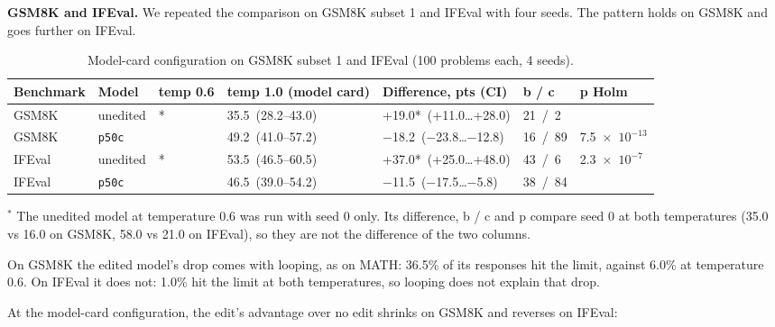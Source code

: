 \documentclass[11pt]{article}
\begin{document}
\textbf{GSM8K and IFEval.} We repeated the comparison on GSM8K subset 1 and IFEval with four seeds. The pattern holds on GSM8K and goes further on IFEval.

\begin{table}[htbp]
\centering
\caption{Model-card configuration on GSM8K subset 1 and IFEval (100 problems each, 4 seeds).}\label{tab:6}
\footnotesize\setlength{\tabcolsep}{4pt}
\begin{tabularx}{\linewidth}{>{\raggedright\arraybackslash\hsize=0.920\hsize}X>{\raggedright\arraybackslash\hsize=0.766\hsize}X>{\raggedright\arraybackslash\hsize=0.562\hsize}X>{\raggedright\arraybackslash\hsize=1.328\hsize}X>{\raggedright\arraybackslash\hsize=1.788\hsize}X>{\raggedright\arraybackslash\hsize=0.613\hsize}X>{\raggedright\arraybackslash\hsize=1.022\hsize}X}
\toprule
\textbf{Benchmark} & \textbf{Model} & \textbf{temp 0.6} & \textbf{temp 1.0 (model card)} & \textbf{Difference, pts (CI)} & \textbf{b / c} & \textbf{p Holm} \\
\midrule
GSM8K & unedited & 16.0* & \mbox{35.5 (28.2--43.0)} & \mbox{+19.0* (+11.0\ldots{}+28.0)} & \mbox{21 / 2} & 0.00013 \\
GSM8K & \texttt{p50c} & 67.5 & \mbox{49.2 (41.0--57.2)} & \mbox{$-$18.2 ($-$23.8\ldots{}$-$12.8)} & \mbox{16 / 89} & \mbox{7.5 $\times$ $10^{-13}$} \\
IFEval & unedited & 21.0* & \mbox{53.5 (46.5--60.5)} & \mbox{+37.0* (+25.0\ldots{}+48.0)} & \mbox{43 / 6} & \mbox{2.3 $\times$ $10^{-7}$} \\
IFEval & \texttt{p50c} & 58.0 & \mbox{46.5 (39.0--54.2)} & \mbox{$-$11.5 ($-$17.5\ldots{}$-$5.8)} & \mbox{38 / 84} & 0.00011 \\
\bottomrule
\end{tabularx}
\par\smallskip\footnotesize $^{*}$ The unedited model at temperature 0.6 was run with seed 0 only. Its difference, b / c and p compare seed 0 at both temperatures (35.0 vs 16.0 on GSM8K, 58.0 vs 21.0 on IFEval), so they are not the difference of the two columns.
\end{table}

On GSM8K the edited model's drop comes with looping, as on MATH: 36.5\% of its responses hit the limit, against 6.0\% at temperature 0.6. On IFEval it does not: 1.0\% hit the limit at both temperatures, so looping does not explain that drop.

At the model-card configuration, the edit's advantage over no edit shrinks on GSM8K and reverses on IFEval:
\end{document}
